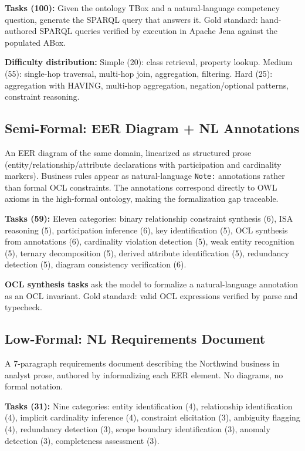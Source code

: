 \documentclass[runningheads]{llncs}
\begin{document}
\textbf{Tasks (100):} Given the ontology TBox and a natural-language competency question, generate the SPARQL query that answers it. Gold standard: hand-authored SPARQL queries verified by execution in Apache Jena against the populated ABox.

\textbf{Difficulty distribution:} Simple (20): class retrieval, property lookup. Medium (55): single-hop traversal, multi-hop join, aggregation, filtering. Hard (25): aggregation with HAVING, multi-hop aggregation, negation/optional patterns, constraint reasoning.

\subsection{Semi-Formal: EER Diagram + NL Annotations}

An EER diagram of the same domain, linearized as structured prose (entity/relationship/attribute declarations with participation and cardinality markers). Business rules appear as natural-language \texttt{Note:} annotations rather than formal OCL constraints. The annotations correspond directly to OWL axioms in the high-formal ontology, making the formalization gap traceable.

\textbf{Tasks (59):} Eleven categories: binary relationship constraint synthesis (6), ISA reasoning (5), participation inference (6), key identification (5), OCL synthesis from annotations (6), cardinality violation detection (5), weak entity recognition (5), ternary decomposition (5), derived attribute identification (5), redundancy detection (5), diagram consistency verification (6).

\textbf{OCL synthesis tasks} ask the model to formalize a natural-language annotation as an OCL invariant. Gold standard: valid OCL expressions verified by parse and typecheck.

\subsection{Low-Formal: NL Requirements Document}

A 7-paragraph requirements document describing the Northwind business in analyst prose, authored by informalizing each EER element. No diagrams, no formal notation.

\textbf{Tasks (31):} Nine categories: entity identification (4), relationship identification (4), implicit cardinality inference (4), constraint elicitation (3), ambiguity flagging (4), redundancy detection (3), scope boundary identification (3), anomaly detection (3), completeness assessment (3).
\end{document}
